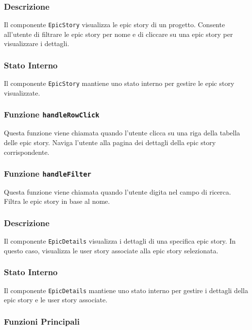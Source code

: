 \documentclass{article}
\begin{document}
\subsubsection*{Descrizione}

Il componente \texttt{EpicStory} visualizza le epic story di un progetto. Consente all'utente di filtrare le epic story per nome e di cliccare su una epic story per visualizzare i dettagli.

\subsubsection*{Stato Interno}
Il componente \texttt{EpicStory} mantiene uno stato interno per gestire le epic story visualizzate.


\subsubsection*{Funzione \texttt{handleRowClick}}
Questa funzione viene chiamata quando l'utente clicca su una riga della tabella delle epic story. Naviga l'utente alla pagina dei dettagli della epic story corrispondente.

\subsubsection*{Funzione \texttt{handleFilter}}
Questa funzione viene chiamata quando l'utente digita nel campo di ricerca. Filtra le epic story in base al nome.

\subsubsection*{Descrizione}

Il componente \texttt{EpicDetails} visualizza i dettagli di una specifica epic story. In questo caso, visualizza le user story associate alla epic story selezionata.

\subsubsection*{Stato Interno}
Il componente \texttt{EpicDetails} mantiene uno stato interno per gestire i dettagli della epic story e le user story associate.

\subsubsection*{Funzioni Principali}
\end{document}
